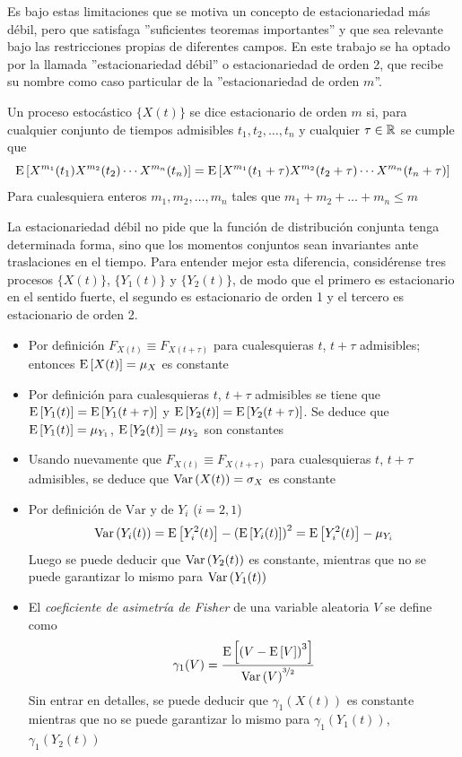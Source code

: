 Es bajo estas limitaciones que se motiva un concepto de estacionariedad m\'as d\'ebil, pero que
satisfaga ''suficientes teoremas importantes'' y que sea relevante bajo las restricciones
propias de diferentes campos. En este trabajo se ha optado por la llamada 
''estacionariedad d\'ebil'' o estacionariedad de orden 2, que recibe su nombre como caso
particular de la ''estacionariedad de orden $m$''.

\begin{defn}
Un proceso estoc\'astico $\{ X(t) \}$
se dice estacionario de orden $m$ si, para cualquier 
conjunto de tiempos admisibles $t_1,t_2,\dots,t_n$ y cualquier $\tau \in \mathbb{R}$
se cumple que
\begin{equation*}
\mathrm{E}\left[  X^{m_1}(t_1)X^{m_2}(t_2)\cdots X^{m_n}(t_n)  \right]
=
\mathrm{E}\left[  X^{m_1}(t_1+\tau)X^{m_2}(t_2+\tau)\cdots X^{m_n}(t_n+\tau)  \right]
\end{equation*}
Para cualesquiera enteros $m_1,m_2,\dots,m_n$ tales que $m_1+m_2+\dots+m_n \leq m$
\label{est_orden_m}
\end{defn}

La estacionariedad d\'ebil no pide que la funci\'on
de distribuci\'on conjunta tenga determinada forma, sino que los momentos conjuntos sean 
invariantes ante traslaciones en el tiempo. Para entender mejor esta diferencia, consid\'erense
tres procesos $\{X(t)\}$, $\{Y_1(t)\}$ y $\{Y_2(t)\}$, de modo que el primero es
estacionario en el sentido fuerte, el segundo es estacionario de orden 1 y el tercero es
estacionario de orden 2.
\begin{itemize}
\item Por definici\'on $F_{X(t) } \equiv F_{X(t+\tau)}$ para cualesquieras $t$, $t+\tau$
admisibles; entonces $\mathrm{E}\left[ X(t) \right] = \mu_X$ es constante
\item Por definici\'on
para cualesquieras $t$, $t+\tau$ admisibles se tiene que $\mathrm{E}\left[ Y_1(t) \right]=\mathrm{E}\left[ Y_1(t+\tau) \right]$ y
$\mathrm{E}\left[ Y_2(t) \right]=\mathrm{E}\left[ Y_2(t+\tau) \right]$. Se deduce que $\mathrm{E}\left[ Y_1(t) \right] = \mu_{Y_1}$, 
$\mathrm{E}\left[ Y_2(t) \right] = \mu_{Y_2}$ son constantes
\item Usando nuevamente que $F_{X(t) } \equiv F_{X(t+\tau)}$ para cualesquieras $t$, $t+\tau$
admisibles, se deduce que $\mathrm{Var}\left( X(t) \right) = \sigma_X$ es constante
\item Por definici\'on de $\mathrm{Var}$ y de $Y_i$ ($i=2,1$)
$$\mathrm{Var}\left( Y_i(t) \right) = \mathrm{E}\left[ Y_i^{2}(t) \right] - \left( \mathrm{E}\left[ Y_i(t) \right] \right)^{2} = \mathrm{E}\left[ Y_i^{2}(t) \right] - \mu_{Y_i}$$
Luego se puede deducir que 
$\mathrm{Var}\left( Y_2(t) \right)$ es
constante, mientras que no se puede garantizar lo mismo para $\mathrm{Var}\left( Y_1(t) \right)$
\item El \textit{coeficiente de asimetr\'ia de Fisher} 
de una variable aleatoria $V$ se define como
$$
\gamma_1(V) = \frac{\mathrm{E}\left[ \left(V-\mathrm{E}\left[ V \right]\right)^{3} \right]}{\mathrm{Var}\left( V \right)^{\nicefrac{3}{2}}}
$$
Sin entrar en detalles, se puede deducir que $\gamma_1(X(t))$ es constante mientras que no se
puede garantizar lo mismo para $\gamma_1(Y_1(t))$, $\gamma_1(Y_2(t))$
\end{itemize}

